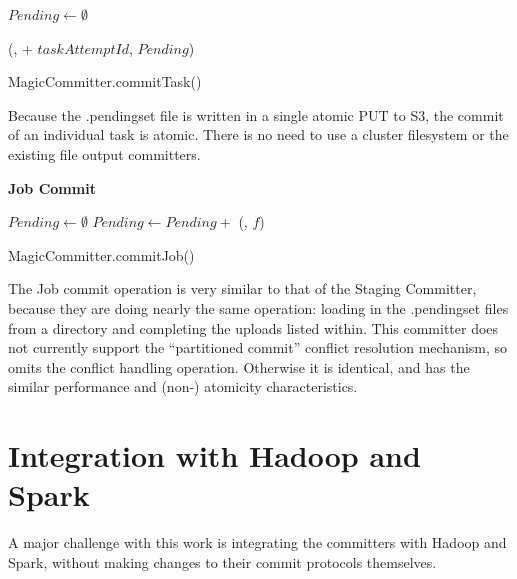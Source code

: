 \documentclass[conference]{IEEEtran}
\begin{document}
\begin{procedure}
  \MagicVars
  $Pending \longleftarrow \emptyset$\;

  \savePendingSet(\fs, \jobAttemptPath + $taskAttemptId$, $Pending$)\;

  \caption{MagicCommitter.commitTask()}
  \label{alg:MagicCommitter.commitTask}

\end{procedure}

Because the .pendingset file is written in a single atomic PUT to S3, the
commit of an individual task is atomic.
There is no need to use a cluster filesystem or the existing file output committers.


\textbf{Job Commit}

\begin{procedure}
  \MagicVars

  $Pending \longleftarrow \emptyset$\;
   {
  $Pending \longleftarrow Pending + $ \loadPendingSet(\clusterfs, $f$)\;
  }

  \caption{MagicCommitter.commitJob()}
  \label{alg:MagicCommitter.commitJob}
\end{procedure}

The Job commit operation is very similar to that of the Staging Committer, because
they are doing nearly the same operation: loading in the .pendingset files
from a directory and completing the uploads listed within.
This committer does not currently support the ``partitioned commit'' conflict
resolution mechanism, so omits the conflict handling operation.
Otherwise it is identical, and has the similar performance and (non-) atomicity
characteristics.



\section{Integration with Hadoop and Spark}
\label{sec:integration}

A major challenge with this work is integrating the committers with Hadoop
and Spark, without making changes to their commit protocols themselves.
\end{document}
